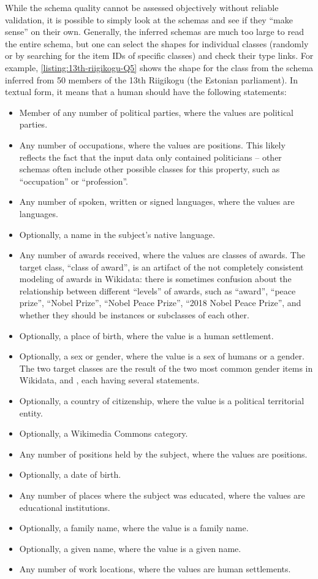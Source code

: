 While the \gls{schema} quality cannot be assessed objectively without reliable validation,
it is possible to simply look at the \glspl{schema} and see if they “make sense” on their own.
Generally, the inferred \glspl{schema} are much too large to read the entire \gls{schema},
but one can select the \glspl{shape} for individual classes
(randomly or by searching for the \glspl{item ID} of specific classes)
and check their type links.
For example, \cref{listing:13th-riigikogu-Q5} shows the \gls{shape} for the class 
from the \gls{schema} inferred from 50 members of the 13th Riigikogu (the Estonian parliament).
In textual form, it means that a human should have the following \glspl{statement}:
\begin{itemize}
\item Member of any number of political parties, where the values are political parties.
\item Any number of occupations, where the values are positions.
  This likely reflects the fact that the input data only contained politicians –
  other \glspl{schema} often include other possible classes for this property,
  such as “occupation” or “profession”.
\item Any number of spoken, written or signed languages, where the values are languages.
\item Optionally, a name in the subject’s native language.
\item Any number of awards received, where the values are classes of awards.
  The target class, “class of award”, is an artifact of the not completely consistent modeling of awards in \gls{Wikidata}:
  there is sometimes confusion about the relationship between different “levels” of awards,
  such as “award”, “peace prize”, “Nobel Prize”, “Nobel Peace Prize”, “2018 Nobel Peace Prize”,
  and whether they should be instances or subclasses of each other.
\item Optionally, a place of birth, where the value is a human settlement.
\item Optionally, a sex or gender, where the value is a sex of humans or a gender.
  The two target classes are the result of the two most common gender \glspl{item} in \gls{Wikidata},
   and ,
  each having several  statements.
\item Optionally, a country of citizenship, where the value is a political territorial entity.
\item Optionally, a \gls{Wikimedia Commons} category.
\item Any number of positions held by the subject, where the values are positions.
\item Optionally, a date of birth.
\item Any number of places where the subject was educated, where the values are educational institutions.
\item Optionally, a family name, where the value is a family name.
\item Optionally, a given name, where the value is a given name.
\item Any number of work locations, where the values are human settlements.
\end{itemize}

